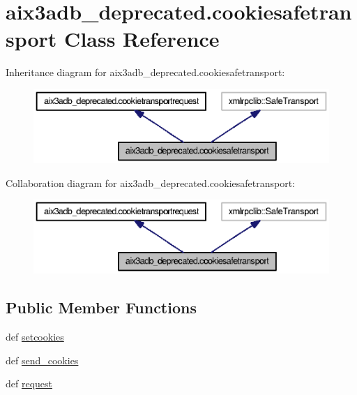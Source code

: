 \section{aix3adb\-\_\-deprecated.\-cookiesafetransport Class Reference}
\label{classaix3adb__deprecated_1_1cookiesafetransport}


Inheritance diagram for aix3adb\-\_\-deprecated.\-cookiesafetransport\-:
\nopagebreak
\begin{figure}[H]
\begin{center}
\leavevmode
\includegraphics[width=350pt]{classaix3adb__deprecated_1_1cookiesafetransport__inherit__graph}
\end{center}
\end{figure}


Collaboration diagram for aix3adb\-\_\-deprecated.\-cookiesafetransport\-:
\nopagebreak
\begin{figure}[H]
\begin{center}
\leavevmode
\includegraphics[width=350pt]{classaix3adb__deprecated_1_1cookiesafetransport__coll__graph}
\end{center}
\end{figure}
\subsection*{Public Member Functions}
\begin{DoxyCompactItemize}
\item 
def \hyperlink{classaix3adb__deprecated_1_1cookietransportrequest_acf43b8f249daa9082719e48a1ea44f76}{setcookies}
\item 
def \hyperlink{classaix3adb__deprecated_1_1cookietransportrequest_a4b9a895b37c002bdc485015d03457660}{send\-\_\-cookies}
\item 
def \hyperlink{classaix3adb__deprecated_1_1cookietransportrequest_a35f43ced122820fb822fa1a374e57b29}{request}
\end{DoxyCompactItemize}
